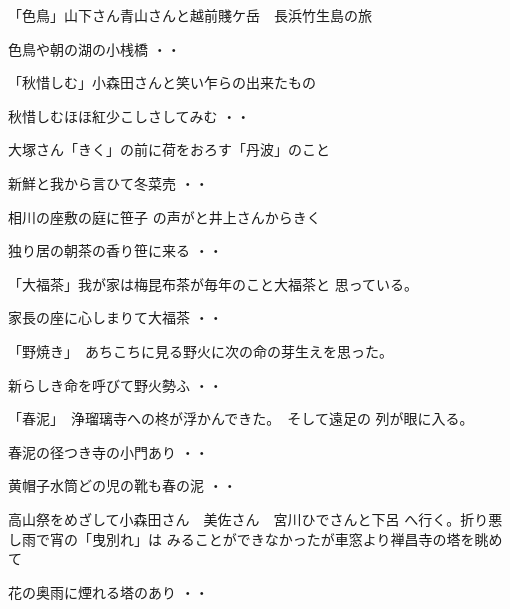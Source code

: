 \documentclass[b5paper]{tbook}
\begin{document}
\vspace{0.6cm}
「色鳥」山下さん青山さんと越前賤ケ岳　長浜竹生島の旅
\begin{shiika}色鳥や朝の湖の小桟橋
\hfill{・・}\end{shiika}
\vspace{0.6cm}
「秋惜しむ」小森田さんと笑い乍らの出来たもの
\begin{shiika}秋惜しむほほ紅少こしさしてみむ
\hfill{・・}\end{shiika}
\vspace{0.6cm}
大塚さん「きく」の前に荷をおろす「丹波」のこと
\begin{shiika}新鮮と我から言ひて冬菜売
\hfill{・・}\end{shiika}
\vspace{0.6cm}
相川の座敷の庭に笹子
の声がと井上さんからきく
\begin{shiika}独り居の朝茶の香り笹に来る
\hfill{・・}\end{shiika}
\vspace{0.6cm}
「大福茶」我が家は梅昆布茶が毎年のこと大福茶と
思っている。
\begin{shiika}家長の座に心しまりて大福茶
\hfill{・・}\end{shiika}
\vspace{0.6cm}
「野焼き」　あちこちに見る野火に次の命の芽生えを思った。
\begin{shiika}新らしき命を呼びて野火勢ふ
\hfill{・・}\end{shiika}
\vspace{0.6cm}
「春泥」　浄瑠璃寺への柊が浮かんできた。　そして遠足の
列が眼に入る。
\begin{shiika}春泥の径つき寺の小門あり
\hfill{・・}\end{shiika}
\begin{shiika}黄帽子水筒どの児の靴も春の泥
\hfill{・・}\end{shiika}
\vspace{0.6cm}
高山祭をめざして小森田さん　美佐さん　宮川ひでさんと下呂
へ行く。折り悪し雨で宵の「曳別れ」は
みることができなかったが車窓より禅昌寺の塔を眺めて
\begin{shiika}花の奥雨に煙れる塔のあり
\hfill{・・}\end{shiika}
\end{document}
